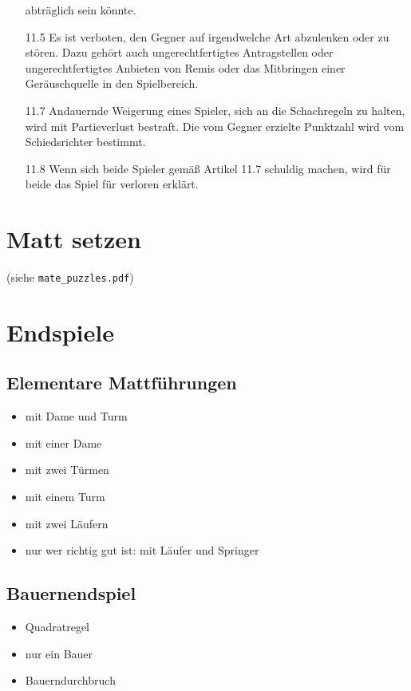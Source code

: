 \documentclass[
  a4paper,
  justified,
  nobib,
]{tufte-handout}
\begin{document}
\begin{enumerate}
    abträglich sein könnte.
  \item[11.5] Es ist verboten, den Gegner auf irgendwelche Art abzulenken oder zu stören.
    Dazu gehört auch ungerechtfertigtes Antragstellen oder ungerechtfertigtes Anbieten von
    Remis oder das Mitbringen einer Geräuschquelle in den Spielbereich.
  \item[11.7] Andauernde Weigerung eines Spieler, sich an die Schachregeln zu halten, wird
    mit Partieverlust bestraft. Die vom Gegner erzielte Punktzahl wird vom Schiedsrichter
    bestimmt.
  \item[11.8] Wenn sich beide Spieler gemäß Artikel 11.7 schuldig machen, wird für beide
    das Spiel für verloren erklärt.
\end{enumerate}

\pagebreak

\section{Matt setzen}%
\label{sec:matt_setzen}

(siehe \texttt{mate\_puzzles.pdf})

\section{Endspiele}%
\label{sec:endspiele}

\subsection{Elementare Mattführungen}%
\label{sub:elementare_mattfuhrungen}

\begin{itemize}
  \item mit Dame und Turm
  \item mit einer Dame
  \item mit zwei Türmen
  \item mit einem Turm
  \item mit zwei Läufern
  \item nur wer richtig gut ist: mit Läufer und Springer
\end{itemize}

\subsection{Bauernendspiel}%
\label{sub:bauernendspiel}

\begin{itemize}
  \item Quadratregel
  \item nur ein Bauer
  \item Bauerndurchbruch
\end{itemize}
\end{document}
